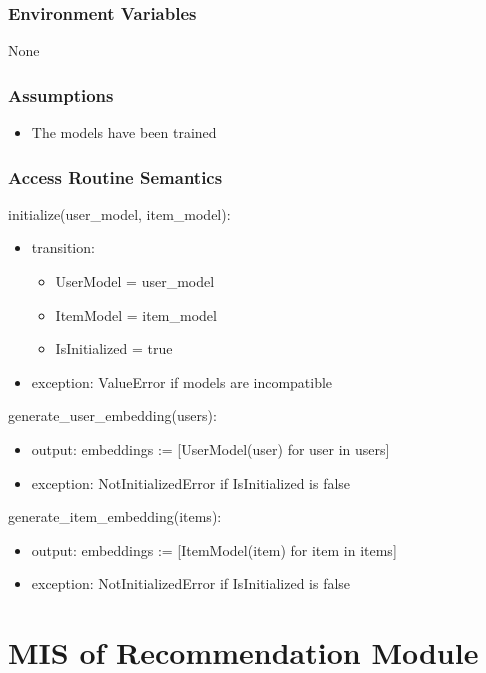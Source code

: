 \documentclass[12pt, titlepage]{article}
\begin{document}
\subsubsection{Environment Variables}

None

\subsubsection{Assumptions}

\begin{itemize}
  \item The models have been trained
\end{itemize}

\subsubsection{Access Routine Semantics}

\noindent initialize(user\_model, item\_model):
\begin{itemize}
\item transition:
  \begin{itemize}
    \item UserModel = user\_model
    \item ItemModel = item\_model
    \item IsInitialized = true
  \end{itemize}
\item exception: ValueError if models are incompatible
\end{itemize}

\noindent generate\_user\_embedding(users):
\begin{itemize}
\item output: embeddings := [UserModel(user) for user in users]
\item exception: NotInitializedError if IsInitialized is false
\end{itemize}


\noindent generate\_item\_embedding(items):
\begin{itemize}
\item output: embeddings := [ItemModel(item) for item in items]
\item exception: NotInitializedError if IsInitialized is false
\end{itemize}


\section{MIS of Recommendation Module } \label{ModuleR}
\end{document}
